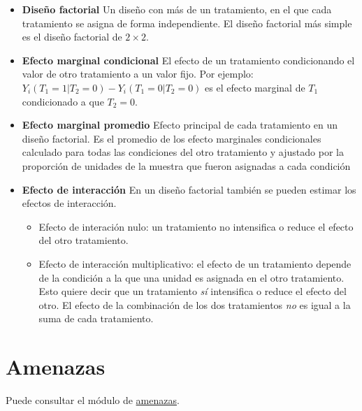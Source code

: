 \documentclass[12pt,spanish,]{book}
\providecommand{\tightlist}{%
  \setlength{\itemsep}{0pt}\setlength{\parskip}{0pt}}
\begin{document}
\begin{itemize}
\item
  \textbf{Diseño factorial} Un diseño con más de un tratamiento, en el que cada tratamiento se asigna de forma independiente. El diseño factorial más simple es el diseño factorial de \(2\times 2\).
\item
  \textbf{Efecto marginal condicional} El efecto de un tratamiento condicionando el valor de otro tratamiento a un valor fijo. Por ejemplo:
  \(Y_i(T_1=1|T_2=0)-Y_i(T_1=0|T_2=0)\) es el efecto marginal de \(T_1\) condicionado a que \(T_2=0\).
\item
  \textbf{Efecto marginal promedio} Efecto principal de cada tratamiento en un diseño factorial. Es el promedio de los efecto marginales condicionales
  calculado para todas las condiciones del otro tratamiento y ajustado por la proporción de unidades de la muestra que fueron asignadas a cada condición
\item
  \textbf{Efecto de interacción} En un diseño factorial también se pueden estimar los efectos de interacción.

  \begin{itemize}
  \tightlist
  \item
    Efecto de interación nulo: un tratamiento no intensifica o reduce el efecto del otro tratamiento.
  \item
    Efecto de interacción multiplicativo: el efecto de un tratamiento depende de la condición a la que una unidad es asignada en el otro tratamiento. Esto quiere decir que un tratamiento \emph{sí} intensifica o reduce el efecto del otro. El efecto de la combinación de los dos tratamientos \emph{no} es igual a la suma de cada tratamiento.
  \end{itemize}
\end{itemize}

\hypertarget{amenazas}{%
\section{Amenazas}\label{amenazas}}

Puede consultar el módulo de \href{amenazas-a-la-validez-interna-de-los-experimentos-aleatorios.html}{amenazas}.
\end{document}
